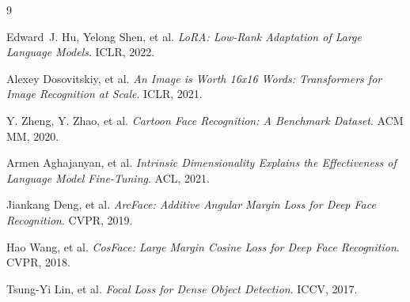 \documentclass[11pt]{article}
\begin{document}
\begin{thebibliography}{9}\setlength{\itemsep}{2pt}

Edward~J. Hu, Yelong Shen, et al.
\newblock \emph{LoRA: Low-Rank Adaptation of Large Language Models}.
\newblock ICLR, 2022.

Alexey Dosovitskiy, et al.
\newblock \emph{An Image is Worth 16x16 Words: Transformers for Image Recognition at Scale}.
\newblock ICLR, 2021.

Y. Zheng, Y. Zhao, et al.
\newblock \emph{Cartoon Face Recognition: A Benchmark Dataset}.
\newblock ACM MM, 2020.

Armen Aghajanyan, et al.
\newblock \emph{Intrinsic Dimensionality Explains the Effectiveness of Language Model Fine-Tuning}.
\newblock ACL, 2021.

Jiankang Deng, et al.
\newblock \emph{ArcFace: Additive Angular Margin Loss for Deep Face Recognition}.
\newblock CVPR, 2019.

Hao Wang, et al.
\newblock \emph{CosFace: Large Margin Cosine Loss for Deep Face Recognition}.
\newblock CVPR, 2018.

Tsung-Yi Lin, et al.
\newblock \emph{Focal Loss for Dense Object Detection}.
\newblock ICCV, 2017.

\end{thebibliography}
\end{document}
